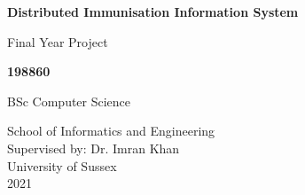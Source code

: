 \begin{titlepage}
    \begin{center}
        \vspace*{1cm}
        
        \Huge
        \textbf{Distributed Immunisation Information System}
        
        \vspace{0.5cm}
        \LARGE
        Final Year Project
        
        \vspace{1.5cm}
        
        \textbf{198860}
        
        \vfill
        
        BSc Computer Science
        
        \vspace{0.8cm}
        
        \Large
        School of Informatics and Engineering\\
        Supervised by: Dr. Imran Khan\\
        University of Sussex\\
        2021
    \end{center}
\end{titlepage}
